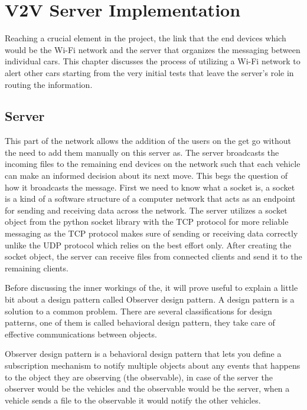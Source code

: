 \chapter{V2V Server Implementation}
Reaching a crucial element in the project, the link that the end devices which would be the Wi-Fi network and the server that organizes the messaging between individual cars. This chapter discusses the process of utilizing a Wi-Fi network to alert other cars starting from the very initial tests that leave the server's role in routing the information.

\section{Server}
This part of the network allows the addition of the users on the get go without the need to add them manually on this server as. The server broadcasts the incoming files to the remaining end devices on the network such that each vehicle can make an informed decision about its next move. This begs the question of how it broadcasts the message. First we need to know what a socket is, a socket is a kind of a software structure of a computer network that acts as an endpoint for sending and receiving data across the network. The server utilizes a socket object from the python socket library with the TCP protocol for more reliable messaging as the TCP protocol makes sure of sending or receiving data correctly unlike the UDP protocol which relies on the best effort only. After creating the socket object, the server can receive files from connected clients and send it to the remaining clients.

Before discussing the inner workings of the, it will prove useful to explain a little bit about a design pattern called Observer design pattern. A design pattern is a solution to a common problem. There are several classifications for design patterns, one of them is called behavioral design pattern, they take care of effective communications between objects.

Observer design pattern is a behavioral design pattern that lets you define a subscription mechanism to notify multiple objects about any events that happens to the object they are observing (the observable), in case of the server the observer would be the vehicles and the observable would be the server, when a vehicle sends a file to the observable it would notify the other vehicles. 
\clearpage

